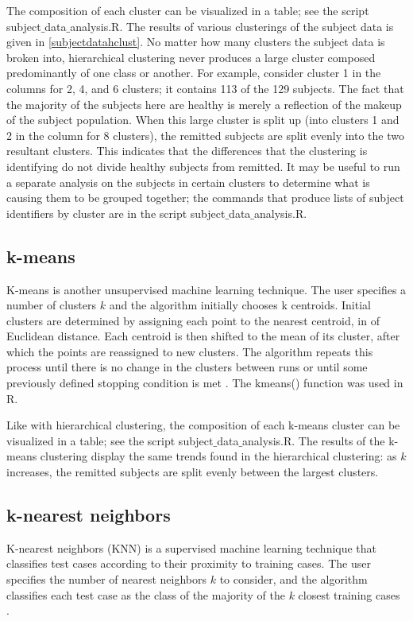 \documentclass[12pt]{report}
\begin{document}
			The composition of each cluster can be visualized in a table; see the script subject$\_$data$\_$analysis.R. The results of various clusterings of the subject data is given in \ref{subjectdatahclust}. No matter how many clusters the subject data is broken into, hierarchical clustering never produces a large cluster composed predominantly of one class or another. For example, consider cluster 1 in the columns for 2, 4, and 6 clusters; it contains 113 of the 129 subjects. The fact that the majority of the subjects here are healthy is merely a reflection of the makeup of the subject population. When this large cluster is split up (into clusters 1 and 2 in the column for 8 clusters), the remitted subjects are split evenly into the two resultant clusters. This indicates that the differences that the clustering is identifying do not divide healthy subjects from remitted. It may be useful to run a separate analysis on the subjects in certain clusters to determine what is causing them to be grouped together; the commands that produce lists of subject identifiers by cluster are in the script subject$\_$data$\_$analysis.R.

			\subsection{k-means}
			K-means is another unsupervised machine learning technique. The user specifies a number of clusters $k$ and the algorithm initially chooses k centroids. Initial clusters are determined by assigning each point to the nearest centroid, in of Euclidean distance. Each centroid is then shifted to the mean of its cluster, after which the points are reassigned to new clusters. The algorithm repeats this process until there is no change in the clusters between runs or until some previously defined stopping condition is met \cite{james2013introduction}. The kmeans() function was used in R.
			
			Like with hierarchical clustering, the composition of each k-means cluster can be visualized in a table; see the script subject$\_$data$\_$analysis.R. The results of the k-means clustering display the same trends found in the hierarchical clustering: as $k$ increases, the remitted subjects are split evenly between the largest clusters.
						
			\subsection{k-nearest neighbors}
			K-nearest neighbors (KNN) is a supervised machine learning technique that classifies test cases according to their proximity to training cases. The user specifies the number of nearest neighbors $k$ to consider, and the algorithm classifies each test case as the class of the majority of the $k$ closest training cases \cite{james2013introduction}.
			
\end{document}
